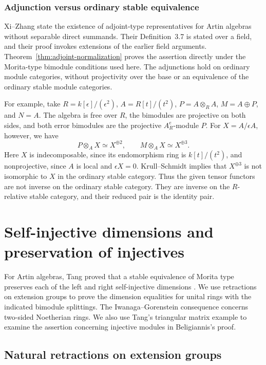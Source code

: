 \documentclass[12pt,a4paper,english,reqno]{amsart}
\numberwithin{equation}{section}
\theoremstyle{plain}
\theoremstyle{definition}
\begin{document}
\subsubsection{Adjunction versus ordinary stable equivalence}

Xi--Zhang \cite[Lemma~3.11, p.~13]{XZ2026} state the existence of
adjoint-type representatives for Artin algebras without separable
direct summands.
Their Definition~3.7 is stated over a field, and their proof invokes
extensions of the earlier field arguments.
Theorem~\ref{thm:adjoint-normalization} proves the assertion directly
under the Morita-type bimodule conditions used here.  The adjunctions
hold on ordinary module categories, without projectivity over the
base or an equivalence of the ordinary stable module categories.

For example, take $R=k[\epsilon]/(\epsilon^2)$,
$A=R[t]/(t^2)$, $P=A\otimes_RA$, $M=A\oplus P$, and $N=A$.
The algebra is free over $R$, the bimodules are projective on
both sides, and both error bimodules are the projective
$A^e_R$-module $P$.  For $X=A/\epsilon A$, however, we have
\[
 P\otimes_AX\simeq X^{\oplus2},
 \qquad M\otimes_AX\simeq X^{\oplus3}.
\]
Here $X$ is indecomposable, since its endomorphism ring is
$k[t]/(t^2)$, and nonprojective, since $A$ is local and
$\epsilon X=0$.  Krull--Schmidt implies that $X^{\oplus3}$ is
not isomorphic to $X$ in the ordinary stable category.
Thus the given tensor functors are not inverse on the ordinary stable
category.  They are inverse on the $R$-relative stable category, and
their reduced pair is the identity pair.

\section{Self-injective dimensions and preservation of injectives}
\label{sec:bel-correction}

For Artin algebras, Tang proved that a stable equivalence of
Morita type preserves each of the left and right self-injective
dimensions \cite[Theorem~1]{bel-Tang2026}. We use retractions on
extension groups to prove the dimension equalities for unital
rings with the indicated bimodule splittings. The Iwanaga--Gorenstein
consequence concerns two-sided Noetherian rings. We also use
Tang's triangular matrix example \cite[Section~3]{bel-Tang2026}
to examine the assertion concerning injective modules in
Beligiannis's proof.

\subsection{Natural retractions on extension groups}
\end{document}
